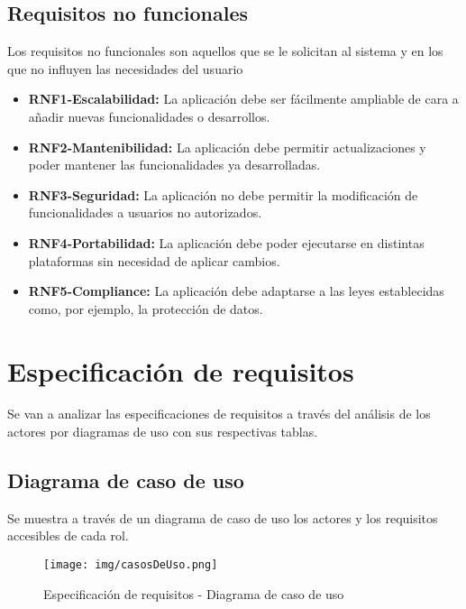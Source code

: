 \subsection{Requisitos no funcionales}
Los requisitos no funcionales son aquellos que se le solicitan al sistema y en los que no influyen las necesidades del usuario \\
\begin{itemize}
    \item \textbf{RNF1-Escalabilidad:} La aplicación debe ser fácilmente ampliable de cara a añadir nuevas funcionalidades o desarrollos.
    \item \textbf{RNF2-Mantenibilidad:} La aplicación debe permitir actualizaciones y poder mantener las funcionalidades ya desarrolladas.
    \item \textbf{RNF3-Seguridad:} La aplicación no debe permitir la modificación de funcionalidades a usuarios no autorizados.
    \item \textbf{RNF4-Portabilidad:} La aplicación debe poder ejecutarse en distintas plataformas sin necesidad de aplicar cambios.
    \item \textbf{RNF5-Compliance:} La aplicación debe adaptarse a las leyes establecidas como, por ejemplo, la protección de datos.
\end{itemize}
\section{Especificación de requisitos}
Se van a analizar las especificaciones de requisitos a través del análisis de los actores por diagramas de uso con sus respectivas tablas.
\subsection{Diagrama de caso de uso}
Se muestra a través de un diagrama de caso de uso los actores y los requisitos accesibles de cada rol.

\begin{landscape}
    \begin{figure}[h!]
        \centering
        \texttt{[image: img/casosDeUso.png]} \\
        \caption{Especificación de requisitos - Diagrama de caso de uso}
        \label{Especificación de requisitos - Diagrama de caso de uso}
    \end{figure}
\end{landscape}



